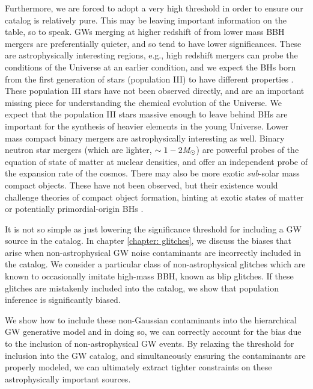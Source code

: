 \begin{refsection}
Furthermore, we are forced to adopt a very high threshold in order to ensure our catalog is relatively pure. This may be leaving important information on the table, so to speak. \acp{GW} merging at higher redshift of from lower mass \ac{BBH} mergers are preferentially quieter, and so tend to have lower significances. These are astrophysically interesting regions, e.g., high redshift mergers can probe the conditions of the Universe at an earlier condition, and we expect the \acp{BH} born from the first generation of stars (population III) to have different properties \citep{abel_formation_2002, belczynski_first_2004, stacy_constraining_2013, jaura_trapping_2022}. These population III stars have not been observed directly, and are an important missing piece for understanding the chemical evolution of the Universe. We expect that the population III stars massive enough to leave behind \acp{BH} are important for the synthesis of heavier elements in the young Universe. Lower mass compact binary mergers are astrophysically interesting as well. Binary neutron star mergers (which are lighter, $\sim 1-2\mathit{M_\odot}$) are powerful probes of the equation of state of matter at nuclear densities, and offer an independent probe of the expansion rate of the cosmos. There may also be more exotic \textit{sub}-solar mass compact objects. These have not been observed, but their existence would challenge theories of compact object formation, hinting at exotic states of matter or potentially primordial-origin \acp{BH} \citep{carr_black_1974, DeLuca:2020qqa, 2017PhRvD..96l3523A}. 

It is not so simple as just lowering the significance threshold for including a \ac{GW} source in the catalog. In chapter \ref{chapter: glitches}, we discuss the biases that arise when non-astrophysical \ac{GW} noise contaminants are incorrectly included in the catalog. We consider a particular class of non-astrophysical glitches which are known to occasionally imitate high-mass \ac{BBH}, known as blip glitches. If these glitches are mistakenly included into the catalog, we show that population inference is significantly biased. 

We show how to include these non-Gaussian contaminants into the hierarchical \ac{GW} generative model and in doing so, we can correctly account for the bias due to the inclusion of non-astrophysical \ac{GW} events. By relaxing the threshold for inclusion into the \ac{GW} catalog, and simultaneously ensuring the contaminants are properly modeled, we can ultimately extract tighter constraints on these astrophysically important sources. 


\end{refsection}
